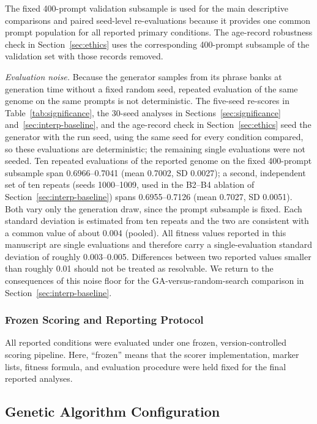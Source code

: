 \documentclass[mathematics,article,submit,xetex,moreauthors]{Definitions/mdpi}
\begin{document}
The fixed 400-prompt validation subsample is used for the main descriptive
comparisons and paired seed-level re-evaluations because it provides one common
prompt population for all reported primary conditions. The age-record robustness check in
Section~\ref{sec:ethics} uses the corresponding 400-prompt subsample of the
validation set with those records removed.

\emph{Evaluation noise.} Because the generator samples from its phrase
banks at generation time without a fixed random seed, repeated evaluation
of the same genome on the same prompts is not deterministic. The five-seed re-scores in Table~\ref{tab:significance}, the 30-seed analyses in
Sections~\ref{sec:significance} and~\ref{sec:interp-baseline}, and the age-record
check in Section~\ref{sec:ethics} seed the generator with the run seed, using the
same seed for every condition compared, so these evaluations are deterministic;
the remaining single evaluations were not seeded. Ten repeated
evaluations of the reported genome on the fixed 400-prompt subsample span
0.6966--0.7041 (mean 0.7002, SD 0.0027); a second, independent set of ten
repeats (seeds 1000--1009, used in the B2--B4 ablation of
Section~\ref{sec:interp-baseline}) spans 0.6955--0.7126 (mean 0.7027,
SD 0.0051). Both vary only the generation draw, since the prompt subsample is
fixed. Each standard deviation is estimated from ten repeats and the two are
consistent with a common value of about 0.004 (pooled). All fitness values
reported in this manuscript are single evaluations and therefore carry a
single-evaluation standard deviation of roughly 0.003--0.005. Differences between
two reported values smaller than roughly 0.01 should not be treated as
resolvable. We return to the consequences of this noise floor for the
GA-versus-random-search comparison in
Section~\ref{sec:interp-baseline}.


\subsubsection{Frozen Scoring and Reporting Protocol}
\label{sec:frozen-scorer}

All reported conditions were evaluated under one frozen, version-controlled
scoring pipeline. Here, ``frozen'' means that the scorer implementation,
marker lists, fitness formula, and evaluation procedure were held fixed for
the final reported analyses.

\subsection{Genetic Algorithm Configuration}
\label{sec:ga-config}
\end{document}
